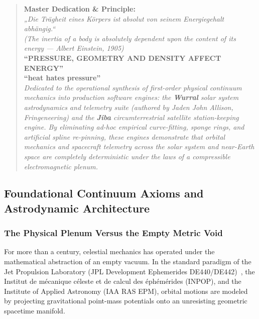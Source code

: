 \documentclass[11pt,a4paper]{article}
\begin{document}
\begin{quote}
\centering
\textbf{Master Dedication \& Principle:}\\
\textit{„Die Trägheit eines Körpers ist absolut von seinem Energiegehalt abhängig.“}\\
\textit{(The inertia of a body is absolutely dependent upon the content of its energy --- Albert Einstein, 1905)}\\[0.5em]
\textbf{``PRESSURE, GEOMETRY AND DENSITY AFFECT ENERGY''}\\
\textbf{``heat hates pressure''}\\[0.5em]
\textit{Dedicated to the operational synthesis of first-order physical continuum mechanics into production software engines: the \textbf{Wurral} solar system astrodynamics and telemetry suite (authored by Jaden John Allison, Fringeneering) and the \textbf{Jiba} circumterrestrial satellite station-keeping engine. By eliminating ad-hoc empirical curve-fitting, sponge rings, and artificial spline re-pinning, these engines demonstrate that orbital mechanics and spacecraft telemetry across the solar system and near-Earth space are completely deterministic under the laws of a compressible electromagnetic plenum.}
\end{quote}

\subsection{Foundational Continuum Axioms and Astrodynamic Architecture}
\label{subsec:continuum_axioms}

\subsubsection{The Physical Plenum Versus the Empty Metric Void}
\label{subsubsec:plenum_vs_void}

For more than a century, celestial mechanics has operated under the mathematical abstraction of an empty vacuum. In the standard paradigm of the Jet Propulsion Laboratory (JPL Development Ephemerides DE440/DE442)~\cite{Park2021}, the Institut de m\'ecanique c\'eleste et de calcul des \'eph\'em\'erides (INPOP), and the Institute of Applied Astronomy (IAA RAS EPM), orbital motions are modeled by projecting gravitational point-mass potentials onto an unresisting geometric spacetime manifold. 
\end{document}
